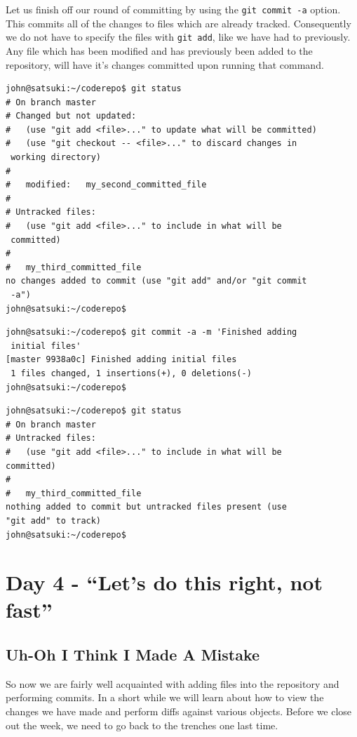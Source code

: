 Let us finish off our round of committing by using the \texttt{git commit -a} option.  This commits all of the changes to files which are already tracked.  Consequently we do not have to specify the files with \texttt{git add}, like we have had to previously.  Any file which has been modified and has previously been added to the repository, will have it's changes committed upon running that command.

\begin{Verbatim}[frame=leftline,framerule=1mm,fontsize=\relsize{-3}] 
john@satsuki:~/coderepo$ git status
# On branch master
# Changed but not updated:
#   (use "git add <file>..." to update what will be committed)
#   (use "git checkout -- <file>..." to discard changes in 
 working directory)
#
#	modified:   my_second_committed_file
#
# Untracked files:
#   (use "git add <file>..." to include in what will be 
 committed)
#
#	my_third_committed_file
no changes added to commit (use "git add" and/or "git commit 
 -a")
john@satsuki:~/coderepo$ 
\end{Verbatim} 

\begin{Verbatim}[frame=leftline,framerule=1mm,fontsize=\relsize{-3}] 
john@satsuki:~/coderepo$ git commit -a -m 'Finished adding 
 initial files'
[master 9938a0c] Finished adding initial files
 1 files changed, 1 insertions(+), 0 deletions(-)
john@satsuki:~/coderepo$ 
\end{Verbatim} 

\begin{Verbatim}[frame=leftline,framerule=1mm,fontsize=\relsize{-3}] 
john@satsuki:~/coderepo$ git status
# On branch master
# Untracked files:
#   (use "git add <file>..." to include in what will be 
committed)
#
#	my_third_committed_file
nothing added to commit but untracked files present (use 
"git add" to track)
john@satsuki:~/coderepo$ 

\end{Verbatim} 

\section{Day 4 - ``Let's do this right, not fast''}

\subsection{Uh-Oh I Think I Made A Mistake}

So now we are fairly well acquainted with adding files into the repository and performing commits.  In a short while we will learn about how to view the changes we have made and perform diffs against various objects.  Before we close out the week, we need to go back to the trenches one last time.

